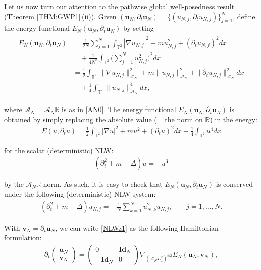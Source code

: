 \documentclass[letterpaper, 11pt,  reqno]{amsart}
\newcommand{\1}{\hspace{0.5mm}\text{I}\hspace{0.2mm}}
\newcommand{\noi}{\noindent}
\newcommand{\R}{\mathbb{R}}
\newcommand{\T}{\mathbb{T}}
\newcommand{\Id}{\textbf{Id}}
\newcommand{\Dl}{\Delta}
\newcommand{\dt}{\partial_t}
\newcommand{\nb}{\nabla}
\newcommand{\A}{\mathcal{A}}
\newcommand{\vv}{\mathbf{v}}
\newcommand{\uu}{\mathbf{u}}
\numberwithin{equation}{section}
\numberwithin{theorem}{section}
\begin{document}
Let us now turn our attention 
to 
the  pathwise global well-posedness result 
(Theorem \ref{THM:GWP1}\,(ii)).
Given
$(\uu_N, \dt \uu_N)
= \{(u_{N, j}, \dt u_{N, j})\}_{j = 1}^N$, 
define the energy functional 
$E_N (\uu_N, \dt \uu_N) $
by setting
\begin{align}
\begin{split}
E_N (\uu_N, \dt \uu_N) 
&= \frac{1}{2N} \sum_{j = 1}^N \int_{\T^2} |\nb u_{N, j}|^2 + m u_{N, j}^2 + (\dt  u_{N, j})^2 dx\\
& \quad  + \frac{1}{4N^2} \int_{\T^2} \Big( \sum_{j = 1}^N  u_{N, j}^2 \Big)^2 dx \\
&= \frac{1}{2}  \int_{\T^2} \|\nb  u_{N, j}\|_{\A_N}^2 
+ m \|u_{N, j}\|_{\A_N}^2 + \|\dt  u_{N, j}\|_{\A_N}^2 dx\\
& \quad  + \frac{1}{4} \int_{\T^2} \|  u_{N, j}\|_{\A_N}^4 dx, 
\end{split}
\label{E1}
\end{align}


\noi
where $\A_N = \A_N \R$ is as in \eqref{AN0}.
The energy functional 
$E_N (\uu_N, \dt \uu_N)$ 
is obtained
by simply replacing  the absolute value (= the norm on $\R$)
in the energy:
\begin{align}
E(u, \dt u)
= \frac{1}{2}  \int_{\T^2} |\nb  u|^2
+ m u^2 + (\dt  u)^2 dx + \frac{1}{4} \int_{\T^2} u^4 dx
\label{EW1}
\end{align}


\noi
 for the scalar (deterministic) NLW:
 \begin{align}
 (\dt^2 + m - \Dl) u= - u^3
 \label{EW2}
 \end{align}
 
 \noi
by the $\A_N \R$-norm.
As such, it is easy to check that 
$E_N (\uu_N, \dt \uu_N)$ is conserved
under the following (deterministic) NLW system:
\begin{align}
    (\dt^2 + m - \Dl) u_{N, j} = - \frac{1}{N} \sum_{k = 1}^N u_{N, k}^2 u_{N, j}, 
\qquad     j = 1, \dots, N.
\label{NLWz1}
\end{align}

\noi
With $\vv_N = \dt \uu_N$, we can write \eqref{NLWz1}
as 
the following Hamiltonian formulation:
\begin{align}
\dt \begin{pmatrix}
\uu_N  \\ \vv_N
\end{pmatrix}
= \begin{pmatrix}
0 & \Id_N\\
- \Id_N & 0
\end{pmatrix}
\nb_{(\A_N L^2_x)^{\otimes 2}} E_N(\uu_N, \vv_N), 
\label{NLWz2}
\end{align}
\end{document}
